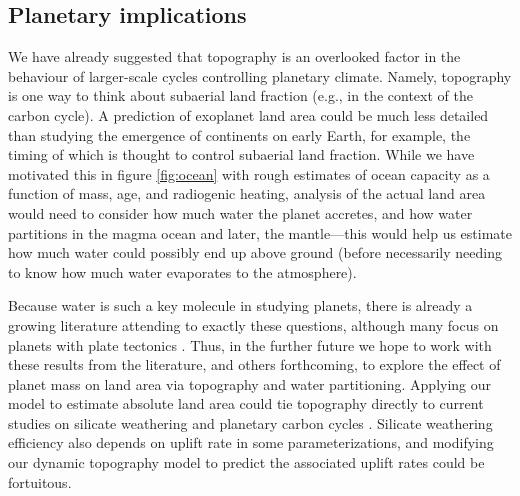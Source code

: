 


\subsection{Planetary implications}

We have already suggested that topography is an overlooked factor in the behaviour of larger-scale cycles controlling planetary climate. Namely, topography is one way to think about subaerial land fraction (e.g., in the context of the carbon cycle). A prediction of exoplanet land area could be much less detailed than studying the emergence of continents on early Earth, for example, the timing of which is thought to control subaerial land fraction. While we have motivated this in figure \ref{fig:ocean} with rough estimates of ocean capacity as a function of mass, age, and radiogenic heating, analysis of the actual land area would need to consider how much water the planet accretes, and how water partitions in the magma ocean and later, the mantle---this would help us estimate how much water could possibly end up above ground (before necessarily needing to know how much water evaporates to the atmosphere). 

Because water is such a key molecule in studying planets, there is already a growing literature attending to exactly these questions, although many focus on planets with plate tectonics \citep[e.g.,][]{Elkins-Tanton2008, Cowan2014, Komacek2016}. Thus, in the further future we hope to work with these results from the literature, and others forthcoming, to explore the effect of planet mass on land area via topography and water partitioning. Applying our model to estimate absolute land area could tie topography directly to current studies on silicate weathering and planetary carbon cycles \citep{Graham2020}. Silicate weathering efficiency also depends on uplift rate in some parameterizations, and modifying our dynamic topography model to predict the associated uplift rates could be fortuitous. 






